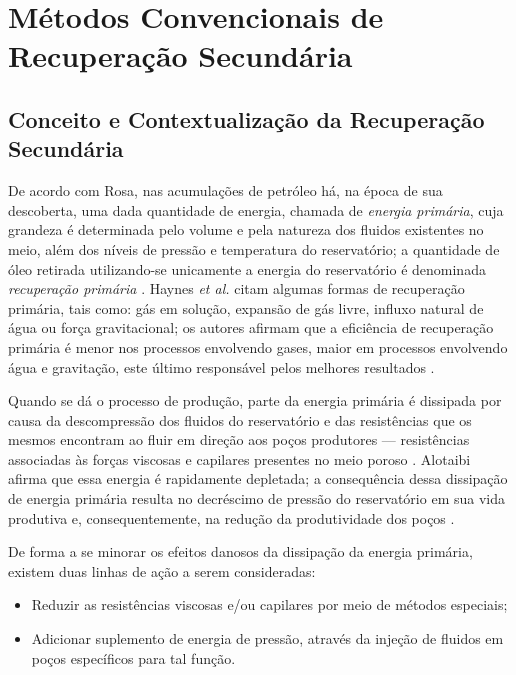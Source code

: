 
\section{M\'{e}todos Convencionais de Recupera\c{c}\~{a}o Secund\'{a}ria}

\subsection{Conceito e Contextualiza\c{c}\~{a}o da Recupera\c{c}\~{a}o Secund\'{a}ria}

De acordo com Rosa, nas acumula\c{c}\~{o}es de petr\'{o}leo h\'{a}, na \'{e}poca de sua descoberta, uma dada quantidade de energia, chamada de \textit{energia prim\'{a}ria}, cuja grandeza \'{e} determinada pelo volume e pela natureza dos fluidos existentes no meio, al\'{e}m dos n\'{i}veis de press\~{a}o e temperatura do reservat\'{o}rio; a quantidade de \'{o}leo retirada utilizando-se unicamente a energia do reservat\'{o}rio \'{e} denominada \textit{recupera\c{c}\~{a}o prim\'{a}ria} \cite{engres}. Haynes \textit{et al.} citam algumas formas de recupera\c{c}\~{a}o prim\'{a}ria, tais como: g\'{a}s em solu\c{c}\~{a}o, expans\~{a}o de g\'{a}s livre, influxo natural de \'{a}gua ou for\c{c}a gravitacional; os autores afirmam que a efici\^{e}ncia de recupera\c{c}\~{a}o prim\'{a}ria \'{e} menor nos processos envolvendo gases, maior em processos envolvendo \'{a}gua e gravita\c{c}\~{a}o, este \'{u}ltimo respons\'{a}vel pelos melhores resultados \cite{oil1976}.

Quando se d\'{a} o processo de produ\c{c}\~{a}o, parte da energia prim\'{a}ria \'{e} dissipada por causa da descompress\~{a}o dos fluidos do reservat\'{o}rio e das resist\^{e}ncias que os mesmos encontram ao fluir em dire\c{c}\~{a}o aos po\c{c}os produtores --- resist\^{e}ncias associadas \`{a}s for\c{c}as viscosas e capilares presentes no meio poroso \cite{engres}. Alotaibi afirma que essa energia \'{e} rapidamente depletada; a consequ\^{e}ncia dessa dissipa\c{c}\~{a}o de energia prim\'{a}ria resulta no decr\'{e}scimo de press\~{a}o do reservat\'{o}rio em sua vida produtiva e, consequentemente, na redu\c{c}\~{a}o da produtividade dos po\c{c}os \cite{alotaibi}. 

De forma a se minorar os efeitos danosos da dissipa\c{c}\~{a}o da energia prim\'{a}ria, existem duas linhas de a\c{c}\~{a}o a serem consideradas:

\begin{itemize}
\item Reduzir as resist\^{e}ncias viscosas e/ou capilares por meio de m\'{e}todos especiais;
\item Adicionar suplemento de energia de press\~{a}o, atrav\'{e}s da inje\c{c}\~{a}o de fluidos em po\c{c}os espec\'{i}ficos para tal fun\c{c}\~{a}o.
\end{itemize}


